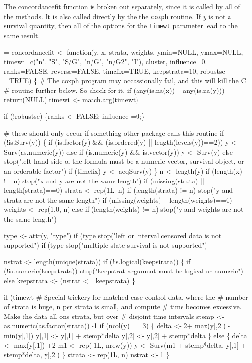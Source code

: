 \documentclass{article}
\newcommand{\code}[1]{\texttt{#1}}
\begin{document}
The concordancefit function is broken out separately, since it is called
by all of the methods.  It is also called directly by the the \code{coxph} 
routine. 
If $y$ is not a survival quantity, then all of the options for the
\code{timewt} parameter lead to the same result.

\begin{nwchunk}
=
 concordancefit <- function(y, x, strata, weights, ymin=NULL, ymax=NULL, 
                             timewt=c("n", "S", "S/G", "n/G", "n/G2", "I"),
                             cluster, influence=0, ranks=FALSE, reverse=FALSE,
                             timefix=TRUE, keepstrata=10, robustse =TRUE) \{
     # The coxph program may occassionally fail, and this will kill the C
     #  routine further below.  So check for it.
     if (any(is.na(x)) || any(is.na(y))) return(NULL)
     timewt <- match.arg(timewt)
 
     if (!robustse) \{ranks <- FALSE; influence =0;\}
 
     # these should only occur if something other package calls this routine
     if (!is.Surv(y)) \{
         if (is.factor(y) && (is.ordered(y) || length(levels(y))==2))
             y <- Surv(as.numeric(y))
         else if (is.numeric(y) && is.vector(y))  y <- Surv(y)
         else stop("left hand side of the formula must be a numeric vector,
  survival object, or an orderable factor")
         if (timefix) y <- aeqSurv(y)
     \}
     n <- length(y)
     if (length(x) != n) stop("x and y are not the same length")
     if (missing(strata) || length(strata)==0) strata <- rep(1L, n)
     if (length(strata) != n)
         stop("y and strata are not the same length")
     if (missing(weights) || length(weights)==0) weights <- rep(1.0, n)
     else if (length(weights) != n) stop("y and weights are not the same length")
 
     type <- attr(y, "type")
     if (type %
         stop("left or interval censored data is not supported")
     if (type %
         stop("multiple state survival is not supported")
 
     nstrat <- length(unique(strata))
     if (!is.logical(keepstrata)) \{
         if (!is.numeric(keepstrata))
             stop("keepstrat argument must be logical or numeric")
         else keepstrata <- (nstrat <= keepstrata)
     \}
 
     if (timewt %
         # Special trickery for matched case-control data, where the
         #  number of strata is huge, n per strata is small, and compute
         #  time becomes excessive.  Make the data all one strata, but over
         #  disjoint time intervals
         stemp <- as.numeric(as.factor(strata)) -1
         if (ncol(y) ==3) \{
             delta <- 2+ max(y[,2]) - min(y[,1])
             y[,1] <- y[,1] + stemp*delta
             y[,2] <- y[,2] + stemp*delta
         \}
         else \{
             delta <- max(y[,1]) +2
             m1 <- rep(-1L, nrow(y))
             y <- Surv(m1 + stemp*delta, y[,1] + stemp*delta, y[,2])
         \}
         strata <- rep(1L, n)
         nstrat <- 1
     \}
 

\end{nwchunk}
\end{document}
